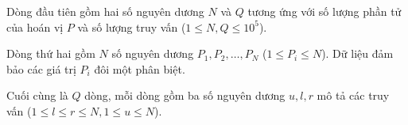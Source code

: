 Dòng đầu tiên gồm hai số nguyên dương $N$ và $Q$ tương ứng với số lượng phần tử của hoán vị $P$ và số lượng truy vấn ($1\le N,Q\le 10^5$).

Dòng thứ hai gồm $N$ số nguyên dương $P_1,P_2,\dots,P_N$ ($1\le P_i\le N$). Dữ liệu đảm bảo các giá trị $P_i$ đôi một phân biệt.

Cuối cùng là $Q$ dòng, mỗi dòng gồm ba số nguyên dương $u,l,r$ mô tả các truy vấn ($1\le l\le r\le N,1\le u\le N$).